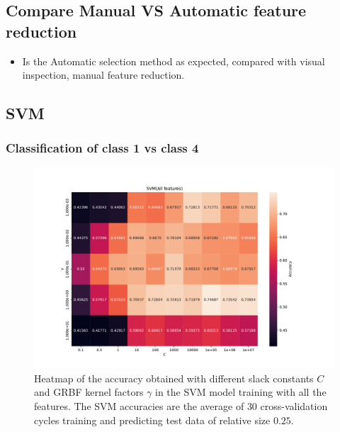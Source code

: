 \subsection{Compare Manual VS Automatic feature reduction}
\begin{itemize}
    \item Is the Automatic selection method as expected, compared with visual
        inspection, manual feature reduction.   
\end{itemize}




\subsection{SVM}

\subsubsection{Classification of class 1 vs class 4}

\begin{figure}[H]
\centering
\includegraphics[width=1\textwidth]{Figures/accuracy(C,gamma)0}
\caption{Heatmap of the accuracy obtained with different slack constants $C$ and 
GRBF kernel factors $\gamma $ in the SVM model training with all the features. The SVM accuracies are the average of $30$ cross-validation 
cycles training and predicting test data of relative size $0.25$.}
\label{fig:Figures-accuracy-C-gamma-0}
\end{figure}

